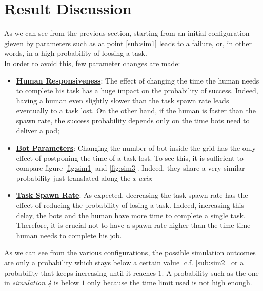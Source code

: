\documentclass[10pt,a4paper]{article}
\begin{document}
	\section{Result Discussion}
			As we can see from the previous section, starting from an initial configuration gieven by parameters such as at point \ref{sub:sim1} leads to a failure, or, in other words, in a high probability of loosing a task.\\In order to avoid this, few parameter changes are made:
			\begin{itemize}
				\item {\textbf{\underline{Human Responsiveness}}: The effect of changing the time the human needs to complete his task has a huge impact on the probability of success. Indeed, having a human even slightly slower than the task spawn rate leads eventually to a task lost. On the other hand, if the human is faster than the spawn rate, the success probability depends only on the time bots need to deliver a pod;}
				\item {\textbf{\underline{Bot Parameters}}: Changing the number of bot inside the grid has the only effect of postponing the time of a task lost. To see this, it is sufficient to compare figure \ref{fig:sim1} and \ref{fig:sim3}. Indeed, they share a very similar probability just translated along the \emph{x axis};}
				\item {\textbf{\underline{Task Spawn Rate}}:} As expected, decreasing the task spawn rate has the effect of reducing the probability of losing a task. Indeed, increasing this delay, the bots and the human have more time to complete a single task. Therefore, it is crucial not to have a spawn rate higher than the time time human needs to complete his job.
			\end{itemize}
			As we can see from the various configurations, the possible simulation outcomes are only a probability which stays below a certain value [c.f. \ref{sub:sim2}] or a probability that keeps increasing until it reaches $1$. A probability such as the one in \emph{simulation 4} is below $1$ only because the time limit used is not high enough.
			
\end{document}
